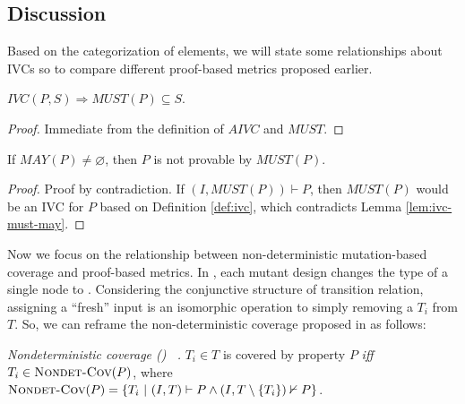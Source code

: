 \subsection{Discussion}
\label{subsec:method-disc}


Based on the categorization of elements, we will state some relationships about IVCs so to compare different proof-based metrics proposed earlier.

\begin{lemma}
  \label{lem:ivc-must-may}
 $IVC(P, S) \Rightarrow  MUST(P) \subseteq S$.
\end{lemma}
\begin{proof}
 Immediate from the definition of $AIVC$ and $MUST$.
\end{proof}
\vspace{2mm}

\begin{lemma}
  \label{lem:must-not-enough}
  If $MAY(P) \neq \varnothing$, then $P$ is not provable by $MUST(P)$.
\end{lemma}
\begin{proof}
  Proof by contradiction. If $(I, MUST(P)) \vdash P$, then $MUST(P)$
  would be an IVC for $P$ based on Definition \ref{def:ivc},
  which contradicts Lemma \ref{lem:ivc-must-may}.
\end{proof}
\vspace{2mm}


Now we focus on the relationship between non-deterministic mutation-based coverage and proof-based metrics. In \cite{chockler2010coverage}, each mutant design changes the type of a single node to . Considering the conjunctive structure of transition relation, assigning a ``fresh'' input is an isomorphic operation to simply removing a $T_i$ from $T$.
So, we can reframe the non-deterministic coverage proposed in \cite{chockler2010coverage} as follows:

\begin{definition} {\emph{Nondeterministic coverage (\nondetcov) ~\cite{chockler2010coverage}.} }
\label{def:non-det-2}
$T_i \in T$ is covered by property $P$ \emph{iff} $T_i \in \text{\sc Nondet-Cov} (P)$, where
$\text{\sc Nondet-Cov} (P) = \{T_i~|~ (I, T) \vdash P \wedge (I, T \setminus \{T_i\}) \nvdash P\}$.
\end{definition}


